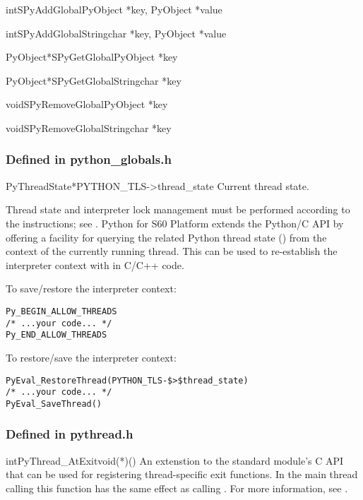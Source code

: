 \begin{cfuncdesc}{int}{SPyAddGlobal}{PyObject *key, PyObject *value}\end{cfuncdesc}
\begin{cfuncdesc}{int}{SPyAddGlobalString}{char *key, PyObject *value}\end{cfuncdesc}
\begin{cfuncdesc}{PyObject*}{SPyGetGlobal}{PyObject *key}\end{cfuncdesc}
\begin{cfuncdesc}{PyObject*}{SPyGetGlobalString}{char *key}\end{cfuncdesc}
\begin{cfuncdesc}{void}{SPyRemoveGlobal}{PyObject *key}\end{cfuncdesc}
\begin{cfuncdesc}{void}{SPyRemoveGlobalString}{char *key}\end{cfuncdesc}

\subsubsection{Defined in python_globals.h}
\begin{cvardesc}{PyThreadState*}{PYTHON_TLS->thread_state}
Current thread state.
\end{cvardesc}

Thread state and interpreter lock management must be performed
according to the instructions; see \cite{PyCAPI}. Python for S60
Platform extends the Python/C API by offering a facility for querying
the related Python thread state () from the context of the currently running thread. This
can be used to re-establish the interpreter context with
 in C/C++ code.

To save/restore the interpreter context:
\begin{verbatim}
Py_BEGIN_ALLOW_THREADS
/* ...your code... */
Py_END_ALLOW_THREADS
\end{verbatim}

To restore/save the interpreter context:
\begin{verbatim}
PyEval_RestoreThread(PYTHON_TLS-$>$thread_state)
/* ...your code... */
PyEval_SaveThread()
\end{verbatim}

\subsubsection{Defined in pythread.h}

\begin{cfuncdesc}{int}{PyThread_AtExit}{void(*)()}
An extenstion to the standard  module's C API that
can be used for registering thread-specific exit functions. In the
main thread calling this function has the same effect as calling
. For more information, see \cite{PyLibRef}.
\end{cfuncdesc}

